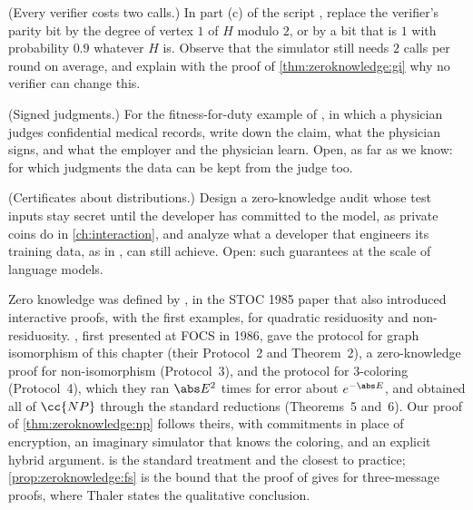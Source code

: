 \begin{refsection}
\begin{exercises}
\item \simulation (Every verifier costs two calls.) In part (c) of the script \zeroknowledgescript, replace the verifier's parity bit by the degree of vertex $1$ of $H$ modulo $2$, or by a bit that is $1$ with probability $0.9$ whatever $H$ is. Observe that the simulator still needs $2$ calls per round on average, and explain with the proof of \cref{thm:zeroknowledge:gi} why no verifier can change this.\label{ex:zeroknowledge:simulate}

\item \research (Signed judgments.) For the fitness-for-duty example of \textcite{ChiesaGuanYildiz2026}, in which a physician judges confidential medical records, write down the claim, what the physician signs, and what the employer and the physician learn. Open, as far as we know: for which judgments the data can be kept from the judge too.\label{ex:zeroknowledge:signed}

\item \research (Certificates about distributions.) Design a zero-knowledge audit whose test inputs stay secret until the developer has committed to the model, as private coins do in \cref{ch:interaction}, and analyze what a developer that engineers its training data, as in \textcite{LuckEtAl2026}, can still achieve. Open: such guarantees at the scale of language models.\label{ex:zeroknowledge:distribution}
\end{exercises}

\notesandrefs
Zero knowledge was defined by \textcite{GoldwasserMicaliRackoff1989}, in the STOC 1985 paper that also introduced interactive proofs, with the first examples, for quadratic residuosity and non-residuosity. \Textcite{GoldreichMicaliWigderson1991}, first presented at FOCS in 1986, gave the protocol for graph isomorphism of this chapter (their Protocol~2 and Theorem~2), a zero-knowledge proof for non-isomorphism (Protocol~3), and the protocol for 3-coloring (Protocol~4), which they ran $\abs E^2$ times for error about $e^{-\abs E}$, and obtained all of $\cc{NP}$ through the standard reductions (Theorems~5 and~6). Our proof of \cref{thm:zeroknowledge:np} follows theirs, with commitments in place of encryption, an imaginary simulator that knows the coloring, and an explicit hybrid argument. \Textcite[Chapter~4]{Goldreich2001} is the standard treatment and \textcite[Chapters~11--13]{Thaler2022} the closest to practice; \cref{prop:zeroknowledge:fs} is the bound that the proof of \textcite[Theorem~5.1]{Thaler2022} gives for three-message proofs, where Thaler states the qualitative conclusion.


\end{refsection}
